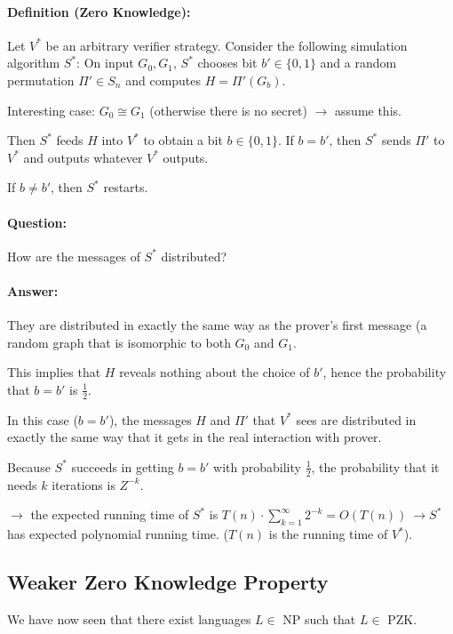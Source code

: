 \documentclass[11pt]{article}
\theoremstyle{definition}
\theoremstyle{definition}
\begin{document}
\paragraph{Definition (Zero Knowledge):} Let $ V^\ast $ be an arbitrary verifier strategy. Consider the following simulation algorithm $ S^\ast $: On input $ G_0, G_1 $, $ S^\ast $ chooses bit $ b' \in \{0, 1 \} $ and a random permutation $ \Pi' \in S_n $ and computes $ H = \Pi' (G_{b}) $.

Interesting case: $ G_0 \cong G_1 $ (otherwise there is no secret) $ \rightarrow $ assume this.

Then $ S^\ast $ feeds $ H $ into $ V^\ast $ to obtain a bit $ b \in \{0, 1\} $. If $ b = b' $, then $ S^\ast $ sends $ \Pi' $ to $ V^\ast $ and outputs whatever $ V^\ast $ outputs.

If $ b \neq b' $, then $ S^\ast $ restarts.

\paragraph{Question:} How are the messages of $ S^\ast $ distributed?
\paragraph{Answer:} They are distributed in exactly the same way as the prover's first message (a random graph that is isomorphic to both $ G_0 $ and $ G_1 $.

This implies that $ H $ reveals nothing about the choice of $ b' $, hence the probability that $ b = b' $ is $ \frac{1}{2} $.

In this case ($ b = b' $), the messages $ H $ and $ \Pi' $ that $ V^\ast $ sees are distributed in exactly the same way that it gets in the real interaction with prover.

Because $ S^\ast $ succeeds in getting $ b = b' $ with probability $ \frac{1}{2} $, the probability that it needs $ k $ iterations is $ Z^{-k} $.

$ \rightarrow $ the expected running time of $ S^\ast $ is $ T(n) \cdot \sum \limits_{k = 1}^\infty 2^{-k} = O(T(n)) ~\rightarrow S^\ast $ has expected polynomial running time. ($ T(n) $ is the running time of $ V^\ast $).


\subsection{Weaker Zero Knowledge Property}
We have now seen that there exist languages $ L \in $ NP such that $ L \in $ PZK.
\end{document}
